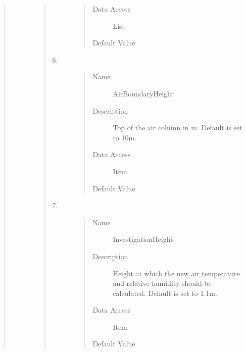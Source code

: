 \documentclass[letterpaper,10pt,english]{sphinxmanual}
\begin{document}
\begin{quote}
\begin{description}
\begin{quote}
\begin{description}
\begin{quote}
\begin{description}
\item[{Data Access}] \leavevmode
List

\item[{Default Value}] \leavevmode
{}

\end{description}\end{quote}

\item[{6.}] \leavevmode\begin{quote}\begin{description}
\item[{Name}] \leavevmode
AirBoundaryHeight

\item[{Description}] \leavevmode
Top of the air column in m. Default is set to 10m.

\item[{Data Access}] \leavevmode
Item

\item[{Default Value}] \leavevmode
{}

\end{description}\end{quote}

\item[{7.}] \leavevmode\begin{quote}\begin{description}
\item[{Name}] \leavevmode
InvestigationHeight

\item[{Description}] \leavevmode
Height at which the new air temperature and relative humidity should be calculated.
Default is set to 1.1m.

\item[{Data Access}] \leavevmode
Item

\item[{Default Value}] \leavevmode
{}

\end{description}\end{quote}


\end{description}
\end{quote}
\end{description}
\end{quote}
\end{document}
